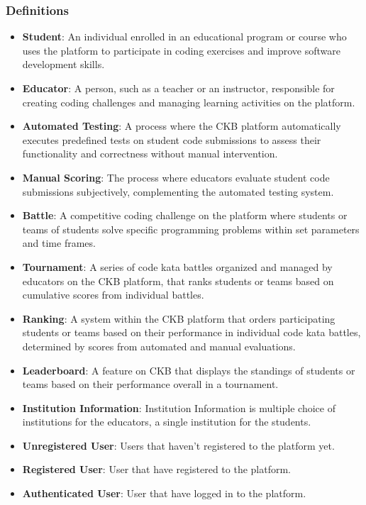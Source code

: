 \subsubsection{Definitions}
\begin{itemize}
    \item \textbf{Student}: An individual enrolled in an educational program or course who uses the platform to participate in coding exercises and improve software development skills.
    \item \textbf{Educator}: A person, such as a teacher or an instructor, responsible for creating coding challenges and managing learning activities on the platform.
    \item \textbf{Automated Testing}: A process where the CKB platform automatically executes predefined tests on student code submissions to assess their functionality and correctness without manual intervention.
    \item \textbf{Manual Scoring}: The process where educators evaluate student code submissions subjectively, complementing the automated testing system.
    \item \textbf{Battle}: A competitive coding challenge on the platform where students or teams of students solve specific programming problems within set parameters and time frames.
    \item \textbf{Tournament}: A series of code kata battles organized and managed by educators on the CKB platform, that ranks students or teams based on cumulative scores from individual battles.
    \item \textbf{Ranking}: A system within the CKB platform that orders participating students or teams based on their performance in individual code kata battles, determined by scores from automated and manual evaluations.
    \item \textbf{Leaderboard}: A feature on CKB that displays the standings of students or teams based on their performance overall in a tournament.
    \item \textbf{Institution Information}: Institution Information is multiple choice of institutions for the educators, a single institution for the students.
    \item \textbf{Unregistered User}: Users that haven't registered to the platform yet.
    \item \textbf{Registered User}: User that have registered to the platform.
    \item \textbf{Authenticated User}: User that have logged in to the platform.

\end{itemize}
